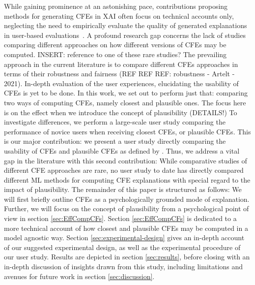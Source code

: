 \textcolor{ACMDarkBlue}{
While gaining prominence at an astonishing pace, contributions proposing methods for generating \glspl{CFE} in \gls{XAI} often focus on technical accounts only, neglecting the need to empirically evaluate the quality of generated explanations in user-based evaluations~\citep{doshi-velez_towards_2017, offert_i_2017}.
A profound research gap concerns the lack of studies comparing different approaches on how different versions of \glspl{CFE} may be computed. 
INSERT: reference to one of these rare studies?
The prevailing approach in the current literature is to compare different \glspl{CFE} approaches in terms of their robustness and fairness (REF REF REF: robustness - Artelt - 2021).
In-depth evaluation of the user experiences, elucidating the usability of \glspl{CFE} is yet to be done.
In this work, we set out to perform just that: comparing two ways of computing \glspl{CFE}, namely closest and plausible ones.
The focus here is on the effect when we introduce the concept of plausibility (DETAILS!)
To investigate differences, we perform a large-scale user study comparing the performance of novice users when receiving closest \glspl{CFE}, or plausible \glspl{CFE}.
This is our major contribution: we present a user study directly comparing the usability of \glspl{CFE} and plausible \glspl{CFE} as defined by \citep{artelt_counterfactual_2020, artelt_efficient_2022}.
Thus, we address a vital gap in the literature with this second contribution: While comparative studies of different \gls{CFE} approaches are rare, no user study to date has directly compared different \gls{ML} methods for computing \gls{CFE} explanations with special regard to the impact of plausibility.
} \textcolor{ACMDarkBlue}{
The remainder of this paper is structured as follows: 
We will first briefly outline \glspl{CFE} as a psychologically grounded mode of explanation. 
Further, we will focus on the concept of plausibility from a psychological point of view in section \ref{sec:EffCompCFs}.
Section \ref{sec:EffCompCFs} is dedicated to a more technical account of how closest and plausible \glspl{CFE} may be computed in a model agnostic way.
Section \ref{sec:experimental-design} gives an in-depth account of our suggested experimental design, as well as the experimental procedure of our user study. 
Results are depicted in section \ref{sec:results}, before closing with an in-depth discussion of insights drawn from this study, including limitations and avenues for future work in section \ref{sec:discussion}.
}


